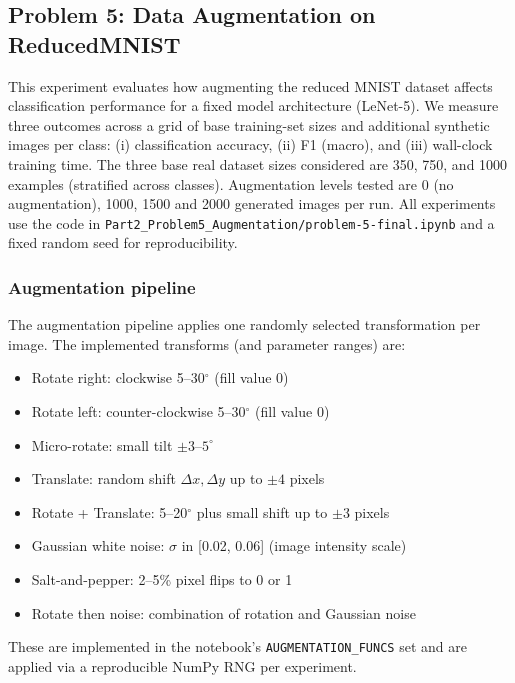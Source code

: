 \subsection{Problem 5: Data Augmentation on ReducedMNIST}

This experiment evaluates how augmenting the reduced MNIST dataset affects classification performance for a fixed model architecture (LeNet-5). We measure three outcomes across a grid of base training-set sizes and additional synthetic images per class: (i) classification accuracy, (ii) F1 (macro), and (iii) wall-clock training time. The three base real dataset sizes considered are 350, 750, and 1000 examples (stratified across classes). Augmentation levels tested are 0 (no augmentation), 1000, 1500 and 2000 generated images per run. All experiments use the code in \texttt{Part2\_Problem5\_Augmentation/problem-5-final.ipynb} and a fixed random seed for reproducibility.

\subsubsection{Augmentation pipeline}
The augmentation pipeline applies one randomly selected transformation per image. The implemented transforms (and parameter ranges) are:
\begin{itemize}
    \item Rotate right: clockwise 5--30$^\circ$ (fill value 0)
    \item Rotate left: counter-clockwise 5--30$^\circ$ (fill value 0)
    \item Micro-rotate: small tilt $\pm3$--$5^\circ$
    \item Translate: random shift $\Delta x,\Delta y$ up to $\pm4$ pixels
    \item Rotate + Translate: 5--20$^\circ$ plus small shift up to $\pm3$ pixels
    \item Gaussian white noise: $\sigma$ in [0.02, 0.06] (image intensity scale)
    \item Salt-and-pepper: 2--5\% pixel flips to 0 or 1
    \item Rotate then noise: combination of rotation and Gaussian noise
\end{itemize}

These are implemented in the notebook's \texttt{AUGMENTATION\_FUNCS} set and are applied via a reproducible NumPy RNG per experiment.

